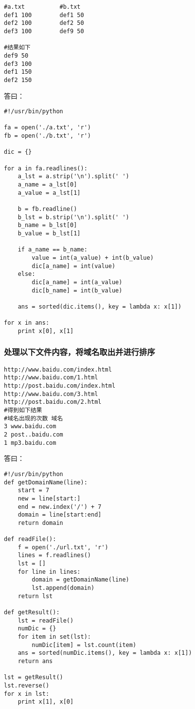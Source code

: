 \documentclass{article}
\begin{document}
\begin{verbatim}
#a.txt			#b.txt
def1 100		def1 50
def2 100		def2 50
def3 100		def9 50

#结果如下
def9 50
def3 100
def1 150
def2 150
\end{verbatim}

答曰：

\begin{verbatim}
#!/usr/bin/python

fa = open('./a.txt', 'r')
fb = open('./b.txt', 'r')

dic = {}

for a in fa.readlines():
	a_lst = a.strip('\n').split(' ')
	a_name = a_lst[0]
	a_value = a_lst[1]
	
	b = fb.readline()
	b_lst = b.strip('\n').split(' ')
	b_name = b_lst[0]
	b_value = b_lst[1]

	if a_name == b_name:
		value = int(a_value) + int(b_value)
		dic[a_name] = int(value)
	else:
		dic[a_name] = int(a_value)
		dic[b_name] = int(b_value)

	ans = sorted(dic.items(), key = lambda x: x[1])

for x in ans:
	print x[0], x[1]
\end{verbatim}

\subsubsection{处理以下文件内容，将域名取出并进行排序}
\begin{verbatim}
http://www.baidu.com/index.html
http://www.baidu.com/1.html
http://post.baidu.com/index.html
http://www.baidu.com/3.html
http://post.baidu.com/2.html
#得到如下结果
#域名出现的次数 域名
3 www.baidu.com
2 post..baidu.com
1 mp3.baidu.com

\end{verbatim}

答曰：

\begin{verbatim}
#!/usr/bin/python
def getDomainName(line):
	start = 7
	new = line[start:]
	end = new.index('/') + 7
	domain = line[start:end]
	return domain

def readFile():
	f = open('./url.txt', 'r')
	lines = f.readlines()
	lst = []
	for line in lines:
		domain = getDomainName(line)
		lst.append(domain)
	return lst	

def getResult():
	lst = readFile()
	numDic = {}
	for item in set(lst):
		numDic[item] = lst.count(item)
	ans = sorted(numDic.items(), key = lambda x: x[1])
	return ans

lst = getResult()
lst.reverse()
for x in lst:
	print x[1], x[0]
\end{verbatim}
\end{document}
